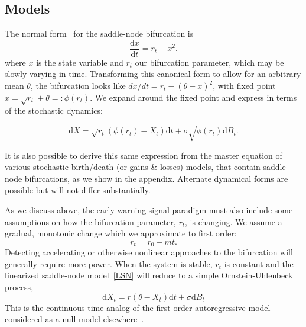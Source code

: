 \documentclass[authoryear,preprint,11pt]{elsarticle}
\newcommand{\ud}{\mathrm{d}}
\begin{document}
\subsection{Models}
The normal form~\citep{Guckenheimer1983, Kuehn2011} for the saddle-node bifurcation is
\begin{equation}
\frac{\ud x}{\ud t} = r_t- x^2.
\label{saddle-node}
\end{equation}
where $x$ is the state variable and $r_t$ our bifurcation parameter, which may be slowly varying in time.  
Transforming this canonical form to allow for an arbitrary mean $\theta$,
the bifurcation looks like $ dx/dt = r_t- (\theta-x)^2 $, with fixed point $\hat x = \sqrt{r_t} +\theta =: \phi(r_t)$.
We expand around the fixed point and express in terms of the stochastic dynamics: 

\begin{equation}
\ud X = \sqrt{ r_t } (\phi(r_t) - X_t)\ud t + \sigma\sqrt{\phi(r_t) } \ud B_t. \label{LSN}
\end{equation}

It is also possible to derive this same expression from the master equation of various stochastic birth/death (or gains \& losses) models,
that contain saddle-node bifurcations, as we show in the appendix.  
Alternate dynamical forms are possible but will not differ substantially.  

As we discuss above, the early warning signal paradigm must also include some assumptions on how the bifurcation parameter, $r_t$, is changing. We assume a gradual, monotonic change which we approximate to first order: 
\begin{equation}
r_t = r_0 - m t.
\label{R_t}
\end{equation}
Detecting accelerating or otherwise nonlinear approaches to the bifurcation will generally require more power. When the system is stable, $r_t$ is constant and the linearized saddle-node model~\eqref{LSN} will reduce to a simple Ornstein-Uhlenbeck process, 
\begin{equation}
\ud X_t = r (\theta - X_t) \ud t + \sigma \ud B_t \label{OU}
\end{equation}
This is the continuous time analog of the first-order autoregressive model considered as a null model elsewhere~\citep[\emph{e.g.}][]{Dakos2008, Guttal2008a}. 
\end{document}
